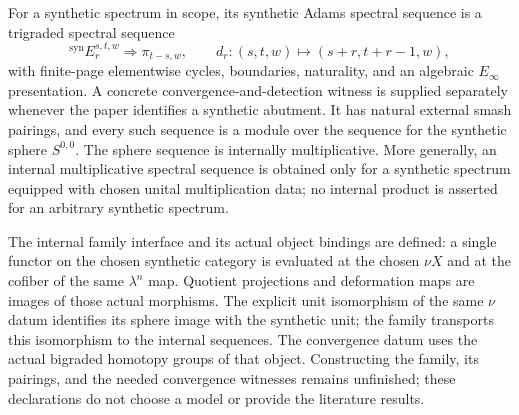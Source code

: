 \begin{definition}
  \label{def:synthetic-adams-ss}
  \notready
  For a synthetic spectrum in scope, its synthetic Adams spectral sequence is
  a trigraded spectral sequence
  \[
    {}^{\mathrm{syn}}E_r^{s,t,w}\Longrightarrow\pi_{t-s,w},
    \qquad d_r:(s,t,w)\mapsto(s+r,t+r-1,w),
  \]
  with finite-page elementwise cycles, boundaries, naturality, and an algebraic
  $E_\infty$ presentation.  A concrete convergence-and-detection witness is
  supplied separately whenever the paper identifies a synthetic abutment.  It has natural external smash pairings, and
  every such sequence is a module over the sequence for the synthetic sphere
  $S^{0,0}$.  The sphere sequence is internally multiplicative.  More
  generally, an internal multiplicative spectral sequence is obtained only
  for a synthetic spectrum equipped with chosen unital multiplication data;
  no internal product is asserted for an arbitrary synthetic spectrum.

  The internal family interface and its actual object bindings are defined:
  a single functor on the chosen synthetic category is evaluated at the
  chosen $\nu X$ and at the cofiber of the same $\lambda^n$ map.  Quotient
  projections and deformation maps are images of those actual morphisms.
  The explicit unit isomorphism of the same $\nu$ datum identifies its
  sphere image with the synthetic unit; the family transports this
  isomorphism to the internal sequences.
  The convergence datum uses the actual bigraded homotopy groups of that
  object.  Constructing the family, its pairings, and the needed convergence
  witnesses remains unfinished; these declarations do not choose a model or
  provide the literature results.
\end{definition}

